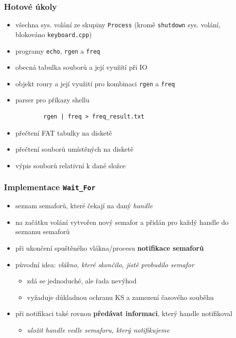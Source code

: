\documentclass[xcolor=dvipsnames]{beamer}
\begin{document}
\begin{frame}[fragile]
\frametitle{Hotové úkoly}

\begin{itemize}
    \item všechna sys. volání ze skupiny \texttt{Process} (kromě \texttt{shutdown} sys. volání, blokováno \texttt{keyboard.cpp})
    \item programy \texttt{echo}, \texttt{rgen} a \texttt{freq}
    \item obecná tabulka souborů a její využití při IO
    \item objekt roury a její využití pro kombinaci \texttt{rgen} a \texttt{freq}
    \item parser pro příkazy shellu 
    \begin{verbatim}
        rgen | freq > freq_result.txt
    \end{verbatim}
    \item přečtení FAT tabulky na disketě
    \item přečtení souborů umístěných na disketě
    \item výpis souborů relativní k dané složce
\end{itemize}


\end{frame}

\begin{frame}[fragile]
\frametitle{Implementace \texttt{Wait\_For}}
    \begin{itemize}
        \item seznam semaforů, které čekají na daný \textit{handle}
        \item na začátku volání vytvořen nový semafor a přidán pro každý handle do seznamu semaforů
        \item při ukončení spuštěného vlákna/procesu \textbf{notifikace semaforů}
        \item původní idea: \textit{vlákno, které skončilo, jistě probudilo semafor}
        \begin{itemize}
            \item zdá se jednoduché, ale řada nevýhod
            \item vyžaduje důkladnou ochranu KS a zamezení časového souběhu
        \end{itemize}
        \item při notifikaci také rovnou \textbf{předávat informaci}, který handle notifikoval
        \begin{itemize}
            \item \textit{uložit handle vedle semaforu, který notifikujeme}
        \end{itemize}   
    \end{itemize}
\end{frame}
\end{document}
